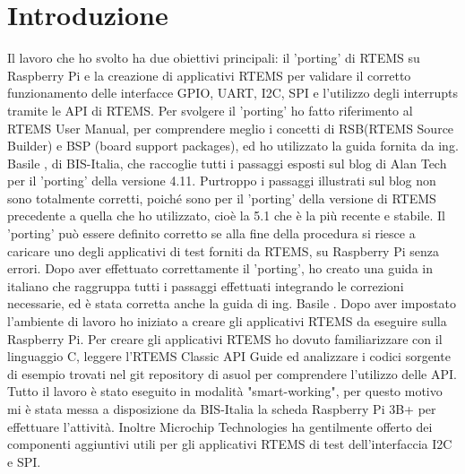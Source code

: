 \documentclass[12pt, a4paper, titlepage, oneside]{book}
\begin{document}

\tableofcontents
\setcounter{page}{0}
\chapter*{Introduzione}
\setcounter{page}{1}
Il lavoro che ho svolto ha due obiettivi principali: il 'porting' di RTEMS su Raspberry Pi e la creazione di applicativi RTEMS per validare il corretto funzionamento delle interfacce GPIO, UART, I2C, SPI  e l'utilizzo degli interrupts tramite le API di RTEMS.\newline
Per  svolgere il 'porting' ho fatto riferimento al RTEMS User Manual\cite{rtemsUM}, per comprendere meglio i concetti di RSB(RTEMS Source Builder) e BSP (board support packages), 
ed ho utilizzato la guida fornita da ing. Basile \cite{giorgio}, di BIS-Italia, che raccoglie tutti i passaggi esposti sul blog di Alan Tech per il 'porting' della versione 4.11.\newline
Purtroppo i passaggi illustrati sul blog non sono totalmente corretti, poiché sono per il 'porting' della versione di RTEMS precedente a quella che ho utilizzato, cioè la 5.1 che è la più recente e stabile.\newline
Il 'porting' può essere definito corretto se alla fine della procedura si riesce a caricare uno degli applicativi di test forniti da RTEMS, su Raspberry Pi senza errori.\newline
Dopo aver effettuato correttamente il 'porting', ho creato una guida in italiano  che raggruppa tutti i passaggi effettuati integrando le correzioni necessarie, ed è stata corretta anche la guida di ing. Basile \cite{giorgio5}.
Dopo aver impostato l'ambiente di lavoro ho iniziato a creare gli applicativi RTEMS da eseguire sulla Raspberry Pi.\newline
Per  creare gli applicativi RTEMS ho dovuto  familiarizzare con il linguaggio C, leggere l'RTEMS Classic API Guide \cite{rtemsCAG} ed analizzare i codici sorgente di esempio trovati nel git repository di asuol\cite{asuol} per  comprendere l'utilizzo delle API. \newline
Tutto il lavoro è stato eseguito in modalità "smart-working", per questo motivo mi è stata messa a disposizione da BIS-Italia la scheda Raspberry Pi 3B+ per  effettuare l'attività. Inoltre Microchip Technologies ha gentilmente offerto dei componenti aggiuntivi utili per gli applicativi RTEMS di test dell'interfaccia I2C e SPI.\newline
\end{document}
